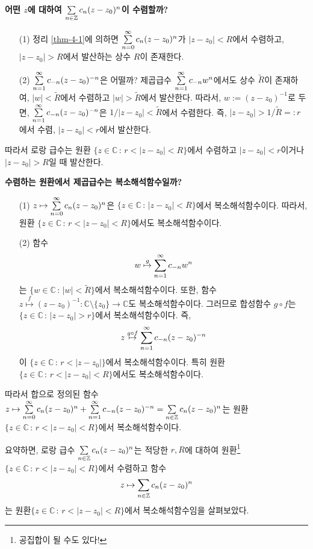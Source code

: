 {\bf 어떤 $z$에 대하여 $\sum\limits_{n\in \mathbb Z} c_n(z-z_0)^n$이 수렴할까?}

\begin{itemize}
\item[(1)] 정리 \ref{thm-4-1}에 의하면
$\sum\limits_{n=0}^\infty c_n(z-z_0)^n$가
$|z-z_0|<R$에서 수렴하고,  $|z-z_0|>R$에서 발산하는  상수 $R$이 존재한다.
\item[(2)] $\sum\limits_{n=1}^\infty c_{-n}(z-z_0)^{-n}$은 어떨까?
제곱급수 $\sum\limits_{n=1}^\infty c_{-n}w^n$에서도
상수 $\tilde R$이 존재하여,
 $|w|<\tilde R$에서 수렴하고
$|w|>\tilde R$에서 발산한다. 따라서,
$w:= (z-z_0)^{-1}$로 두면, $\sum\limits_{n=1}^\infty c_{-n}(z-z_0)^{-n}$은 
$1/|z-z_0| <\tilde R$에서 수렴한다. 즉, $|z-z_0|>1/\tilde R=:r$에서 수렴,
$|z-z_0|<r$에서 발산한다.
\end{itemize}

따라서 로랑 급수는 원환  $\{ z\in \mathbb C \,:\, r < |z-z_0| <R\}$에서 수렴하고
$|z-z_0|<r$이거나 $|z-z_0|>R$일 때 발산한다.

{\bf  수렴하는 원환에서 제곱급수는 복소해석함수일까?}

\begin{itemize}
\item[(1)] $z\mapsto \sum\limits_{n=0}^\infty c_{n}(z-z_0)^n$은
$\{ z\in\mathbb C\,:\, |z-z_0| <R\}$에서 복소해석함수이다. 따라서,
 원환  $\{ z\in \mathbb C \,:\, r < |z-z_0| <R\}$에서도 복소해석함수이다.
\item[(2)] 함수
\[
w \stackrel{g}{\mapsto} \sum\limits_{n=1}^\infty c_{-n}w^n
\]
는 $\{ w\in\mathbb C\,:\, |w| < \tilde R \}$에서 복소해석함수이다.
또한, 함수 $z \stackrel{f}{\mapsto} (z-z_0)^{-1}: \mathbb C \setminus \{z_0\} \to \mathbb C$도
복소해석함수이다.
그러므로 합성함수 $g\circ f$는 $\{ z\in\mathbb C\,:\, |z-z_0| >r \}$에서
복소해석함수이다. 즉,
\[
z \stackrel{g\circ f}{\mapsto} \sum\limits_{n=1}^\infty c_{-n}(z-z_0)^{-n}
\]
이 $\{ z\in\mathbb C \,:\, r<|z-z_0| \}$에서 복소해석함수이다. 
특히 원환  $\{ z\in \mathbb C \,:\, r < |z-z_0| <R\}$에서도 복소해석함수이다.
\end{itemize}

따라서 합으로 정의된 함수
$z \mapsto \sum\limits_{n=0}^\infty c_n(z-z_0)^n + \sum\limits_{n=1}^\infty c_{-n}(z-z_0)^{-n}
= \sum\limits_{n\in \mathbb Z} c_n(z-z_0)^n$는 
원환
$\{ z\in \mathbb C \,:\, r < |z-z_0| <R\}$에서 복소해석함수이다.

요약하면,
로랑 급수 
$\sum\limits_{n\in \mathbb Z} c_n(z-z_0)^n$는 
적당한 $r, R$에 대하여
원환\footnote{공집합이 될 수도 있다!}
$\{ z\in \mathbb C \,:\, r < |z-z_0| <R\}$에서 수렴하고
함수 
\[
z \mapsto \sum\limits_{n\in \mathbb Z} c_n(z-z_0)^n
\]
는 원환$\{ z\in \mathbb C \,:\, r < |z-z_0| <R\}$에서 
복소해석함수임을 살펴보았다.

